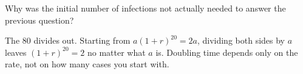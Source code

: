 \documentclass[12pt]{ximera}
\begin{document}
\begin{problem}
Why was the initial number of infections not actually needed to answer the previous
question?

\begin{freeResponse}
\end{freeResponse}

\begin{solution}
The 80 divides out. Starting from $a(1+r)^{20} = 2a$, dividing both sides by $a$
leaves $(1+r)^{20} = 2$ no matter what $a$ is. Doubling time depends only on the
rate, not on how many cases you start with.
\end{solution}
\end{problem}
\end{document}
